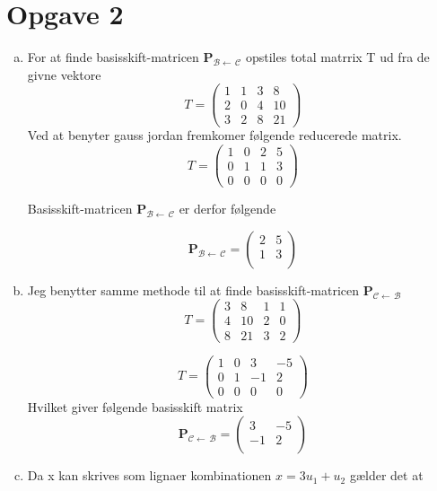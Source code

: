 \documentclass[12pt]{article}
\begin{document}
\section{Opgave 2}
\begin{enumerate}[(a)]
\item 
For at finde basisskift-matricen  $\mathbf{P}_{\mathcal{B} \leftarrow\,\mathcal{C}}$
opstiles total matrrix T ud fra de givne vektore
$$
T = \left(\begin{array}{cc|cc}
1&1&3&8\\
2&0&4&10\\
3&2&8&21
\end{array}\right)
$$
Ved at benyter gauss jordan fremkomer følgende reducerede matrix.
$$
T = \left(\begin{array}{cc|cc}
1&0&2&5\\
0&1&1&3\\
0&0&0&0
\end{array}\right)
$$

Basisskift-matricen $\mathbf{P}_{\mathcal{B} \leftarrow\,\mathcal{C}}$ er derfor
følgende

$$\mathbf{P}_{\mathcal{B} \leftarrow
\,\mathcal{C}} = 
\left(\begin{array}{cc}
2&5\\
1&3\\
\end{array}\right)
$$
\item
Jeg benytter samme methode til at finde basisskift-matricen
$\mathbf{P}_{\mathcal{C} \leftarrow\,\mathcal{B}}$
$$
T = \left(\begin{array}{cc|cc}
3&8&1&1\\
4&10&2&0\\
8&21&3&2
\end{array}\right)
$$

$$
T = \left(\begin{array}{cc|cc}
1&0&3&-5\\
0&1&-1&2\\
0&0&0&0
\end{array}\right)
$$
Hvilket giver følgende basisskift matrix
$$\mathbf{P}_{\mathcal{C} \leftarrow
\,\mathcal{B}} = 
\left(\begin{array}{cc}
3&-5\\
-1&2\\
\end{array}\right)
$$
\item

Da x kan skrives som lignaer kombinationen $x = 3u_1 + u_2$ gælder det at


\end{enumerate}
\end{document}

